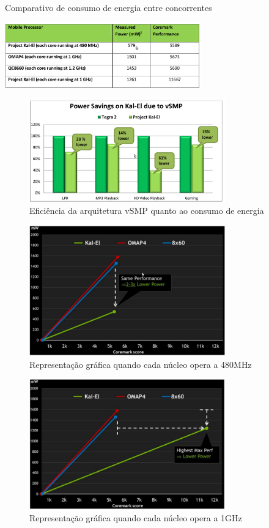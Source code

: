 \documentclass[article]{IEEEtran}
\begin{document}
\begin{table}[ht]
  \centering
  \caption{Comparativo de consumo de energia entre concorrentes}
  \includegraphics[width=8.5cm]{./pictures/Table1.png}
  \label{tab:table1}
\end{table}

\begin{figure}[ht]
  \centering
  \includegraphics[width=8.5cm]{./pictures/PowerSavesVSMP.png}
  \caption{Efici\^encia da arquitetura vSMP quanto ao consumo de energia}
  \label{fig:powersavesvsmp}
\end{figure}

\begin{figure}[ht]
  \centering
  \includegraphics[width=8.5cm]{./pictures/Kal-ElLowerFrequency.png}
  \caption{Representa\c{c}\~ao gr\'afica quando cada n\'ucleo opera a 480MHz}
  \label{fig:kalellowerfrequency}
\end{figure}

\begin{figure}[ht]
  \centering
  \includegraphics[width=8.5cm]{./pictures/Kal-ElHigherFrequency.png}
  \caption{Representa\c{c}\~ao gr\'afica quando cada n\'ucleo opera a 1GHz}
  \label{fig:kalelhigherfrequency}
\end{figure}
\end{document}
